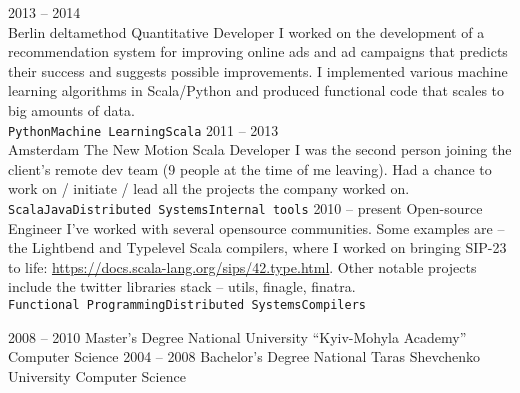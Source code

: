 \documentclass[9pt]{developercv} %
\begin{document}
\begin{entrylist}
	\entry
		{2013 -- 2014\\\footnotesize{Berlin}}
		{deltamethod}
		{Quantitative Developer}
		{I worked on the development of a recommendation system for improving online ads and ad campaigns that predicts their success and suggests possible improvements. I implemented various machine learning algorithms in Scala/Python and produced functional code that scales to big amounts of data.\\ \texttt{Python}\slashsep\texttt{Machine Learning}\slashsep\texttt{Scala}}
	\entry
		{2011 -- 2013\\\footnotesize{Amsterdam}}
		{The New Motion}
		{Scala Developer}
		{I was the second person joining the client's remote dev team (9 people at the time of me leaving). Had a chance to work on / initiate / lead all the projects the company worked on.\\ \texttt{Scala}\slashsep\texttt{Java}\slashsep\texttt{Distributed Systems}\slashsep\texttt{Internal tools}}
	\entry
		{2010 -- present}
		{Open-source}
		{Engineer}
		{I've worked with several opensource communities. Some examples are -- the Lightbend and Typelevel Scala compilers, where I worked on bringing SIP-23 to life: \href{https://docs.scala-lang.org/sips/42.type.html}{https://docs.scala-lang.org/sips/42.type.html}. Other notable projects include the twitter libraries stack -- utils, finagle, finatra.\\ \texttt{Functional Programming}\slashsep\texttt{Distributed Systems}\slashsep\texttt{Compilers}}
\end{entrylist}



\begin{entrylist}
	\entry
		{2008 -- 2010}
		{Master's Degree}
		{National University “Kyiv-Mohyla Academy”}
		{Computer Science}
	\entry
		{2004 -- 2008}
		{Bachelor's Degree}
		{National Taras Shevchenko University}
		{Computer Science}
\end{entrylist}

\end{document}
